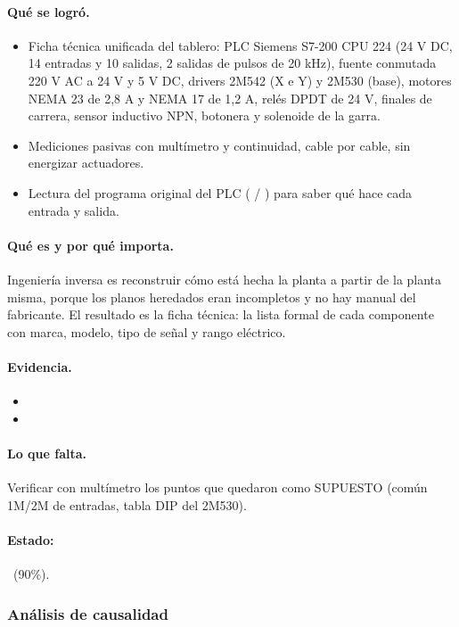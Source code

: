 \documentclass[a4paper,11pt]{article}
\begin{document}
\paragraph{Qué se logró.}
\begin{itemize}
\item Ficha técnica unificada del tablero: PLC Siemens S7-200 CPU 224 (24 V DC, 14 entradas y 10 salidas, 2 salidas de pulsos de 20 kHz), fuente conmutada 220 V AC a 24 V y 5 V DC, drivers 2M542 (X e Y) y 2M530 (base), motores NEMA 23 de 2,8 A y NEMA 17 de 1,2 A, relés DPDT de 24 V, finales de carrera, sensor inductivo NPN, botonera y solenoide de la garra.
\item Mediciones pasivas con multímetro y continuidad, cable por cable, sin energizar actuadores.
\item Lectura del programa original del PLC ( / ) para saber qué hace cada entrada y salida.
\end{itemize}
\paragraph{Qué es y por qué importa.} Ingeniería inversa es reconstruir cómo está hecha la planta a partir de la planta misma, porque los planos heredados eran incompletos y no hay manual del fabricante. El resultado es la ficha técnica: la lista formal de cada componente con marca, modelo, tipo de señal y rango eléctrico.
\paragraph{Evidencia.}
\begin{itemize}\small
\item {}
\item {}
\end{itemize}
\paragraph{Lo que falta.} Verificar con multímetro los puntos que quedaron como SUPUESTO (común 1M/2M de entradas, tabla DIP del 2M530).
\paragraph{Estado:} \parcial~(90\%).
\subsubsection{Análisis de causalidad}
\end{document}

